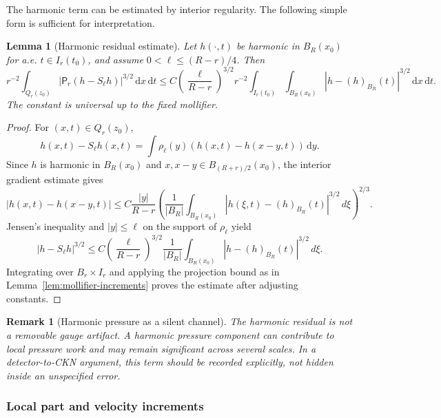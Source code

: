 \documentclass[10pt,a4paper]{amsart}
\numberwithin{equation}{section}
\newtheorem{lemma}[theorem]{Lemma}
\newtheorem{remark}[theorem]{Remark}
\newcommand{\dxdt}{\,\mathrm dx\,\mathrm dt}
\newcommand{\dy}{\,\mathrm dy}
\newcommand{\Pf}{\mathsf P}
\begin{document}
The harmonic term can be estimated by interior regularity.  The following simple form is sufficient for interpretation.

\begin{lemma}[Harmonic residual estimate]\label{lem:harmonic-residual}
Let $h(\cdot,t)$ be harmonic in $B_R(x_0)$ for a.e. $t\in I_r(t_0)$, and assume $0<\ell\le (R-r)/4$.  Then
\begin{equation}\label{eq:harmonic-residual-bound}
r^{-2}\int_{Q_r(z_0)}|\Pf_r(h-S_\ell h)|^{3/2}\dxdt
\le
C\left(\frac{\ell}{R-r}\right)^{3/2}
 r^{-2}\int_{I_r(t_0)}\int_{B_R(x_0)}|h-(h)_{B_R}(t)|^{3/2}\dxdt.
\end{equation}
The constant is universal up to the fixed mollifier.
\end{lemma}

\begin{proof}
For $(x,t)\in Q_r(z_0)$,
\[
h(x,t)-S_\ell h(x,t)=\int\rho_\ell(y)(h(x,t)-h(x-y,t))\dy.
\]
Since $h$ is harmonic in $B_R(x_0)$ and $x,x-y\in B_{(R+r)/2}(x_0)$, the interior gradient estimate gives
\[
|h(x,t)-h(x-y,t)|
\le
C\frac{|y|}{R-r}\left(\frac{1}{|B_R|}\int_{B_R(x_0)}|h(\xi,t)-(h)_{B_R}(t)|^{3/2}\,d\xi\right)^{2/3}.
\]
Jensen's inequality and $|y|\le\ell$ on the support of $\rho_\ell$ yield
\[
|h-S_\ell h|^{3/2}
\le
C\left(\frac{\ell}{R-r}\right)^{3/2}
\frac{1}{|B_R|}\int_{B_R(x_0)}|h-(h)_{B_R}(t)|^{3/2}\,d\xi.
\]
Integrating over $B_r\times I_r$ and applying the projection bound as in Lemma~\ref{lem:mollifier-increments} proves the estimate after adjusting constants.
\end{proof}

\begin{remark}[Harmonic pressure as a silent channel]
The harmonic residual is not a removable gauge artifact.  A harmonic pressure component can contribute to local pressure work and may remain significant across several scales.  In a detector-to-CKN argument, this term should be recorded explicitly, not hidden inside an unspecified error.
\end{remark}

\subsubsection{Local part and velocity increments}
\end{document}
